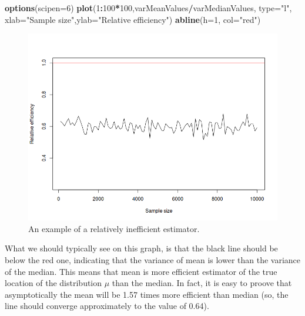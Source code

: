 \documentclass[
]{book}
\newenvironment{Shaded}{\begin{snugshade}}{\end{snugshade}}
\newcommand{\AttributeTok}[1]{\textcolor[rgb]{0.13,0.29,0.53}{#1}}
\newcommand{\DecValTok}[1]{\textcolor[rgb]{0.00,0.00,0.81}{#1}}
\newcommand{\FunctionTok}[1]{\textcolor[rgb]{0.13,0.29,0.53}{\textbf{#1}}}
\newcommand{\NormalTok}[1]{#1}
\newcommand{\SpecialCharTok}[1]{\textcolor[rgb]{0.81,0.36,0.00}{\textbf{#1}}}
\newcommand{\StringTok}[1]{\textcolor[rgb]{0.31,0.60,0.02}{#1}}
\theoremstyle{definition}
\theoremstyle{definition}
\theoremstyle{definition}
\theoremstyle{definition}
\theoremstyle{remark}
\begin{document}
\begin{Shaded}
\begin{Highlighting}[]
\FunctionTok{options}\NormalTok{(}\AttributeTok{scipen=}\DecValTok{6}\NormalTok{)}
\FunctionTok{plot}\NormalTok{(}\DecValTok{1}\SpecialCharTok{:}\DecValTok{100}\SpecialCharTok{*}\DecValTok{100}\NormalTok{,varMeanValues}\SpecialCharTok{/}\NormalTok{varMedianValues, }\AttributeTok{type=}\StringTok{"l"}\NormalTok{, }\AttributeTok{xlab=}\StringTok{"Sample size"}\NormalTok{,}\AttributeTok{ylab=}\StringTok{"Relative efficiency"}\NormalTok{)}
\FunctionTok{abline}\NormalTok{(}\AttributeTok{h=}\DecValTok{1}\NormalTok{, }\AttributeTok{col=}\StringTok{"red"}\NormalTok{)}
\end{Highlighting}
\end{Shaded}

\begin{figure}
\includegraphics[width=11.11in]{images/02-statistics-efficiency} \caption{An example of a relatively inefficient estimator.}\label{fig:statsEfficiecny}
\end{figure}

What we should typically see on this graph, is that the black line should be below the red one, indicating that the variance of mean is lower than the variance of the median. This means that mean is more efficient estimator of the true location of the distribution \(\mu\) than the median. In fact, it is easy to proove that asymptotically the mean will be 1.57 times more efficient than median \citep{WikipediaMedianEfficiency2020} (so, the line should converge approximately to the value of 0.64).
\end{document}
